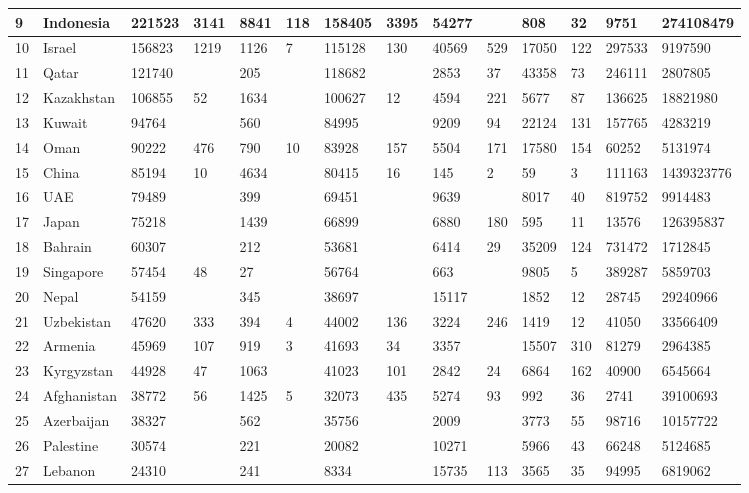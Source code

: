 \begin{landscape}
\begin{footnotesize}
\begin{longtable}{ | l | l | l | l | l | l | l | l | l | l | l | l | l | l | }
	9 & Indonesia & 221523 & 3141 & 8841 & 118 & 158405 & 3395 & 54277 &  & 808 & 32 & 9751 & 274108479 \\ \hline
	10 & Israel & 156823 & 1219 & 1126 & 7 & 115128 & 130 & 40569 & 529 & 17050 & 122 & 297533 & 9197590 \\ \hline
	11 & Qatar & 121740 &  & 205 &  & 118682 &  & 2853 & 37 & 43358 & 73 & 246111 & 2807805 \\ \hline
	12 & Kazakhstan & 106855 & 52 & 1634 &  & 100627 & 12 & 4594 & 221 & 5677 & 87 & 136625 & 18821980 \\ \hline
	13 & Kuwait & 94764 &  & 560 &  & 84995 &  & 9209 & 94 & 22124 & 131 & 157765 & 4283219 \\ \hline
	14 & Oman & 90222 & 476 & 790 & 10 & 83928 & 157 & 5504 & 171 & 17580 & 154 & 60252 & 5131974 \\ \hline
	15 & China & 85194 & 10 & 4634 &  & 80415 & 16 & 145 & 2 & 59 & 3 & 111163 & 1439323776 \\ \hline
	16 & UAE & 79489 &  & 399 &  & 69451 &  & 9639 &  & 8017 & 40 & 819752 & 9914483 \\ \hline
	17 & Japan & 75218 &  & 1439 &  & 66899 &  & 6880 & 180 & 595 & 11 & 13576 & 126395837 \\ \hline
	18 & Bahrain & 60307 &  & 212 &  & 53681 &  & 6414 & 29 & 35209 & 124 & 731472 & 1712845 \\ \hline
	19 & Singapore & 57454 & 48 & 27 &  & 56764 &  & 663 &  & 9805 & 5 & 389287 & 5859703 \\ \hline
	20 & Nepal & 54159 &  & 345 &  & 38697 &  & 15117 &  & 1852 & 12 & 28745 & 29240966 \\ \hline
	21 & Uzbekistan & 47620 & 333 & 394 & 4 & 44002 & 136 & 3224 & 246 & 1419 & 12 & 41050 & 33566409 \\ \hline
	22 & Armenia & 45969 & 107 & 919 & 3 & 41693 & 34 & 3357 &  & 15507 & 310 & 81279 & 2964385 \\ \hline
	23 & Kyrgyzstan & 44928 & 47 & 1063 &  & 41023 & 101 & 2842 & 24 & 6864 & 162 & 40900 & 6545664 \\ \hline
	24 & Afghanistan & 38772 & 56 & 1425 & 5 & 32073 & 435 & 5274 & 93 & 992 & 36 & 2741 & 39100693 \\ \hline
	25 & Azerbaijan & 38327 &  & 562 &  & 35756 &  & 2009 &  & 3773 & 55 & 98716 & 10157722 \\ \hline
	26 & Palestine & 30574 &  & 221 &  & 20082 &  & 10271 &  & 5966 & 43 & 66248 & 5124685 \\ \hline
	27 & Lebanon & 24310 &  & 241 &  & 8334 &  & 15735 & 113 & 3565 & 35 & 94995 & 6819062 \\ \hline

\end{longtable}
\end{footnotesize}
\end{landscape}
